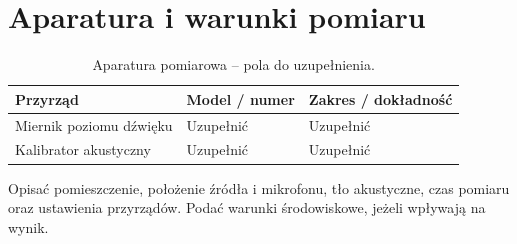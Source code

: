 \section{Aparatura i warunki pomiaru}
\label{sec:aparatura}
\begin{table}[htbp]
  \centering
  \caption{Aparatura pomiarowa -- pola do uzupełnienia.}
  \label{tab:aparatura}
  \begin{tabularx}{\linewidth}{@{}L L L@{}}
    \toprule
    Przyrząd & Model / numer & Zakres / dokładność \\
    \midrule
    Miernik poziomu dźwięku & Uzupełnić & Uzupełnić \\
    Kalibrator akustyczny & Uzupełnić & Uzupełnić \\
    \bottomrule
  \end{tabularx}
\end{table}
Opisać pomieszczenie, położenie źródła i mikrofonu, tło akustyczne,
czas pomiaru oraz ustawienia przyrządów. Podać warunki środowiskowe,
jeżeli wpływają na wynik.
